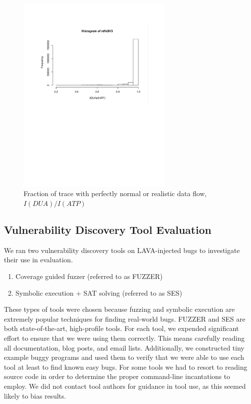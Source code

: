 \begin{figure}
\centering
\includegraphics[width=3in]{rdf.pdf}
\caption{Fraction of trace with perfectly normal or realistic data flow, $I(DUA)/I(ATP)$}
\label{fig:rdf-hist}
\end{figure}




\subsection{Vulnerability Discovery Tool Evaluation}

We ran two vulnerability discovery tools on LAVA-injected bugs to investigate their use in evaluation.
\begin{enumerate}
\item Coverage guided fuzzer (referred to as FUZZER)
\item Symbolic execution + SAT solving (referred to as SES)
\end{enumerate}

These types of tools were chosen because fuzzing and symbolic execution are extremely popular techniques for finding real-world bugs.
FUZZER and SES are both state-of-the-art, high-profile tools. 
For each tool, we expended significant effort to ensure that we were using them correctly.
This means carefully reading all documentation, blog posts, and email lists.
Additionally, we constructed tiny example buggy programs and used them to verify that we were able to use each tool at least to find known easy bugs.  
For some tools we had to resort to reading source code in order to determine the proper command-line incantations to employ. 
We did not contact tool authors for guidance in tool use, as this seemed likely to bias results.

